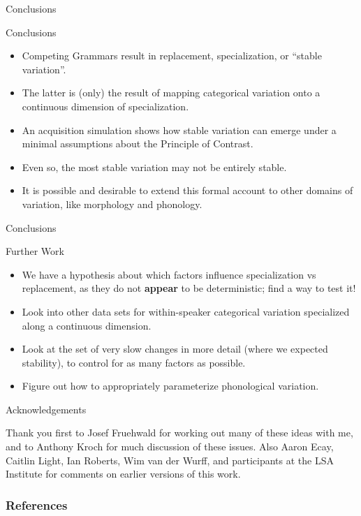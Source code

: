 \documentclass[hyperref={pdfpagelabels=false}]{beamer}
\begin{document}
\begin{frame}{Conclusions}
	\begin{block}{Conclusions}
		\begin{itemize}
			\item Competing Grammars result in replacement, specialization, or ``stable variation''.
			\item The latter is (only) the result of mapping categorical variation onto a continuous dimension of specialization.
			\item An acquisition simulation shows how stable variation can emerge under a minimal assumptions about the Principle of Contrast.
			\item Even so, the most stable variation may not be entirely stable.
			\item It is possible and desirable to extend this formal account to other domains of variation, like morphology and phonology.
		\end{itemize}
	\end{block}
	

\end{frame}

\begin{frame}{Conclusions}
	\begin{block}{Further Work}
		\begin{itemize}
			\item We have a hypothesis about which factors influence specialization vs replacement, as they do not \textbf{appear} to be deterministic; find a way to test it!
			\item Look into other data sets for within-speaker categorical variation specialized along a continuous dimension.
			\item Look at the set of very slow changes in more detail (where we expected stability), to control for as many factors as possible.
			\item Figure out how to appropriately parameterize phonological variation.
		\end{itemize}
	\end{block}

\end{frame}

\begin{frame}{Acknowledgements}
\begin{center}
Thank you first to Josef Fruehwald for working out many of these ideas with me, and to Anthony Kroch for much discussion of these issues. Also Aaron Ecay, Caitlin Light, Ian Roberts, Wim van der Wurff, and participants at the LSA Institute for comments on earlier versions of this work. 
\end{center}
\end{frame}


\begin{frame}[allowframebreaks]
\frametitle{References}
\newcommand*{\newblock}{natbib}


\end{frame}
\end{document}

